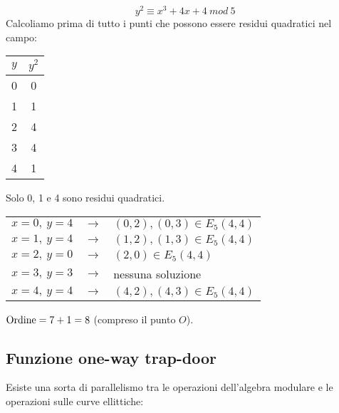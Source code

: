 \begin{example}

    \[ y^2 \equiv x^3 + 4x + 4\ \mathit{mod}\ 5\]
    Calcoliamo prima di tutto i punti che possono essere residui quadratici nel campo:

    \begin{table}[H]
        \centering
        \begin{tabular}{|c|c|}
            \hline
            $y$ & $y^2$ \\\hline\hline
            0   & 0     \\
            1   & 1     \\
            2   & 4     \\
            3   & 4     \\
            4   & 1     \\\hline
        \end{tabular}
    \end{table}

    \noindent Solo 0, 1 e 4 sono residui quadratici.\

    \begin{table}[H]
        \centering
        \begin{tabular}{ l c l }
            $x = 0,\ y = 4$ & $\rightarrow$ & $(0,2), (0,3) \in E_5(4,4)$ \\
            $x = 1,\ y = 4$ & $\rightarrow$ & $(1,2), (1,3) \in E_5(4,4)$ \\
            $x = 2,\ y = 0$ & $\rightarrow$ & $(2,0) \in E_5(4,4)$        \\
            $x = 3,\ y = 3$ & $\rightarrow$ & nessuna soluzione           \\
            $x = 4,\ y = 4$ & $\rightarrow$ & $(4,2), (4,3) \in E_5(4,4)$ \\
        \end{tabular}
    \end{table}

    \noindent $\rm Ordine = 7 + 1 = 8$ (compreso il punto $O$).\

\end{example}

\subsection{Funzione one-way trap-door}

Esiste una sorta di parallelismo tra le operazioni dell'algebra modulare e le operazioni sulle curve ellittiche:

